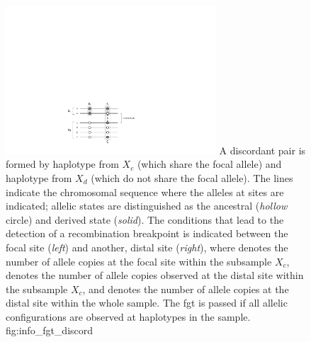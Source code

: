 

\begin{figure}[!htb]
\centering
\includegraphics[width=0.7\textwidth]{./img/ch5/info_fgt_discord}
%
{A discordant pair is formed by  haplotype from $X_c$ (which share the focal allele) and  haplotype from $X_d$ (which do not share the focal allele).
The lines indicate the chromosomal sequence where the alleles at  sites are indicated; allelic states are distinguished as the ancestral (\emph{hollow} circle) and derived state (\emph{solid}).
The conditions that lead to the detection of a recombination breakpoint is indicated between the focal site (\emph{left}) and another, distal site (\emph{right}), where \fk{} denotes the number of allele copies at the focal site within the subsample $X_c$,  denotes the number of allele copies observed at the distal site within the subsample $X_c$, and  denotes the number of allele copies at the distal site within the whole sample.
The \gls{fgt} is passed if all  allelic configurations are observed at  haplotypes in the sample.}%
{fig:info_fgt_discord}
\end{figure}

